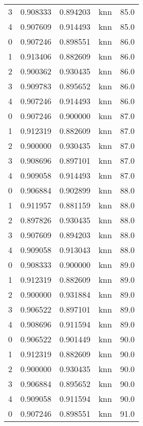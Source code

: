 \begin{tabular}{rrrlr}
     3 & 0.908333 & 0.894203 &      knn &       85.0 \\
     4 & 0.907609 & 0.914493 &      knn &       85.0 \\
     0 & 0.907246 & 0.898551 &      knn &       86.0 \\
     1 & 0.913406 & 0.882609 &      knn &       86.0 \\
     2 & 0.900362 & 0.930435 &      knn &       86.0 \\
     3 & 0.909783 & 0.895652 &      knn &       86.0 \\
     4 & 0.907246 & 0.914493 &      knn &       86.0 \\
     0 & 0.907246 & 0.900000 &      knn &       87.0 \\
     1 & 0.912319 & 0.882609 &      knn &       87.0 \\
     2 & 0.900000 & 0.930435 &      knn &       87.0 \\
     3 & 0.908696 & 0.897101 &      knn &       87.0 \\
     4 & 0.909058 & 0.914493 &      knn &       87.0 \\
     0 & 0.906884 & 0.902899 &      knn &       88.0 \\
     1 & 0.911957 & 0.881159 &      knn &       88.0 \\
     2 & 0.897826 & 0.930435 &      knn &       88.0 \\
     3 & 0.907609 & 0.894203 &      knn &       88.0 \\
     4 & 0.909058 & 0.913043 &      knn &       88.0 \\
     0 & 0.908333 & 0.900000 &      knn &       89.0 \\
     1 & 0.912319 & 0.882609 &      knn &       89.0 \\
     2 & 0.900000 & 0.931884 &      knn &       89.0 \\
     3 & 0.906522 & 0.897101 &      knn &       89.0 \\
     4 & 0.908696 & 0.911594 &      knn &       89.0 \\
     0 & 0.906522 & 0.901449 &      knn &       90.0 \\
     1 & 0.912319 & 0.882609 &      knn &       90.0 \\
     2 & 0.900000 & 0.930435 &      knn &       90.0 \\
     3 & 0.906884 & 0.895652 &      knn &       90.0 \\
     4 & 0.909058 & 0.911594 &      knn &       90.0 \\
     0 & 0.907246 & 0.898551 &      knn &       91.0 \\

\end{tabular}
